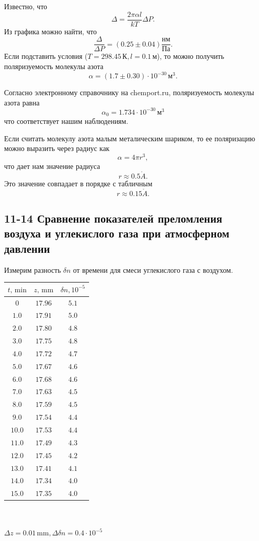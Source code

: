 \documentclass[a4paper,12pt]{article}
\renewcommand{\AA}{\ensuremath{\mathring{A}}}
\begin{document}
Известно, что
\[\Delta = \frac{2\pi\alpha l}{kT}\Delta P.\]
Из графика можно найти, что
\[\frac{\Delta}{\Delta P} = (0.25 \pm 0.04)\frac{\text{нм}}{\text{Па}}.\]
Если подставить условия ($T=298.45\,\text{К}, l=0.1\,\text{м}$), то можно получить поляризуемость молекулы азота
\[\alpha = (1.7\pm0.30) \cdot 10^{-30}\,\text{м}^3.\]

Согласно электронному справочнику на chemport.ru, поляризуемость молекулы азота равна
\[\alpha_0 = 1.734 \cdot 10^{-30}\,\text{м}^3\]
что соответствует нашим наблюдениям.

Если считать молекулу азота малым металическим шариком, то ее поляризацию можно выразить через радиус как
\[\alpha = 4 \pi r^3,\]
что дает нам значение радиуса
\[r \approx 0.5 \AA.\]
Это значение совпадает в порядке с табличным
\[r \approx 0.15 \AA.\]
\subsection*{11-14 Сравнение показателей преломления воздуха и углекислого газа при атмосферном давлении}

Измерим разность $\delta n$ от времени для смеси углекислого газа с воздухом.

\begin{center}
\begin{tabular}{|c|c|c|}\hline
$t\text{, min}$&$z\text{, mm}$&$\delta n, 10^{-5}$\\\hline
$0$&$17.96$&$5.1$\\\hline
$1.0$&$17.91$&$5.0$\\\hline
$2.0$&$17.80$&$4.8$\\\hline
$3.0$&$17.75$&$4.8$\\\hline
$4.0$&$17.72$&$4.7$\\\hline
$5.0$&$17.67$&$4.6$\\\hline
$6.0$&$17.68$&$4.6$\\\hline
$7.0$&$17.63$&$4.5$\\\hline
$8.0$&$17.59$&$4.5$\\\hline
$9.0$&$17.54$&$4.4$\\\hline
$10.0$&$17.53$&$4.4$\\\hline
$11.0$&$17.49$&$4.3$\\\hline
$12.0$&$17.45$&$4.2$\\\hline
$13.0$&$17.41$&$4.1$\\\hline
$14.0$&$17.34$&$4.0$\\\hline
$15.0$&$17.35$&$4.0$\\\hline
\end{tabular}\\~\\
$\Delta z=0.01\,\text{mm}, \Delta \delta n=0.4\cdot10^{-5}$
\end{center}
\end{document}
